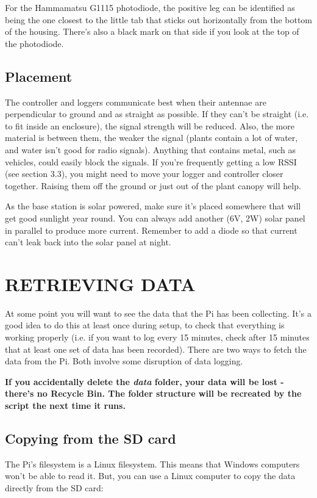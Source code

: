 \documentclass[10pt]{article}
\begin{document}
For the Hammamatsu G1115 photodiode, the positive leg can be identified as being the one closest to the little tab that sticks out horizontally from the bottom of the housing. There's also a black mark on that side if you look at the top of the photodiode.

\subsection{Placement}

The controller and loggers communicate best when their antennae are perpendicular to ground and as straight as possible. If they can't be straight (i.e. to fit inside an enclosure), the signal strength will be reduced. Also, the more material is between them, the weaker the signal (plants contain a lot of water, and water isn't good for radio signals). Anything that contains metal, such as vehicles, could easily block the signals. If you're frequently getting a low RSSI (see section 3.3), you might need to move your logger and controller closer together. Raising them off the ground or just out of the plant canopy will help.

As the base station is solar powered, make sure it's placed somewhere that will get good sunlight year round. You can always add another (6V, 2W) solar panel in parallel to produce more current. Remember to add a diode so that current can't leak back into the solar panel at night.

\section{RETRIEVING DATA}

At some point you will want to see the data that the Pi has been collecting. It's a good idea to do this at least once during setup, to check that everything is working properly (i.e. if you want to log every 15 minutes, check after 15 minutes that at least one set of data has been recorded). There are two ways to fetch the data from the Pi. Both involve some disruption of data logging. \newline

\textbf{If you accidentally delete the \textit{data} folder, your data will be lost - there's no Recycle Bin. The folder structure will be recreated by the script the next time it runs.}

\subsection{Copying from the SD card}
The Pi's filesystem is a Linux filesystem. This means that Windows computers won't be able to read it. But, you can use a Linux computer to copy the data directly from the SD card:
\end{document}
